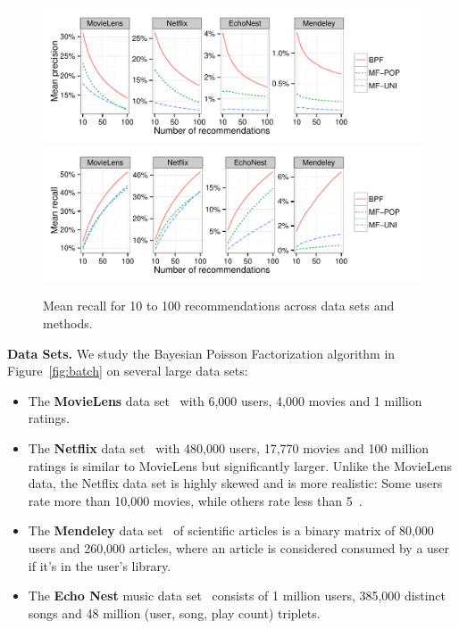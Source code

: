 \begin{figure}[th]
\centering
\includegraphics[width=\textwidth]{./figures/mean_precision_by_method.pdf}\\
\includegraphics[width=\textwidth]{./figures/mean_recall_by_method.pdf}\\
\caption{Mean recall for 10 to 100 recommendations across data sets and methods.}
\label{fig:recall_by_M}
\end{figure}

{\bf Data Sets.} We study the Bayesian Poisson Factorization algorithm
in Figure~\ref{fig:batch} on several large data sets:
\begin{itemize}
\item The {\bf MovieLens} data set~\cite{Herlocker:1999} with 6,000 users, 4,000
  movies and 1 million ratings.
\item The {\bf Netflix} data set~\cite{Koren:2009} with 480,000 users,
  17,770 movies and 100 million ratings is similar to MovieLens but
  significantly larger. Unlike the MovieLens data, the Netflix data
  set is highly skewed and is more realistic: Some users rate more
  than 10,000 movies, while others rate less than
  5~\cite{Salakhutdinov:2008a}.
\item The {\bf Mendeley} data set~\cite{Jack:2010} of scientific
  articles is a binary matrix of
  80,000 users and 260,000 articles, where an article is considered
  consumed by a user if it's in the user's library.
\item The {\bf Echo Nest} music data set~\cite{Bertin-Mahieux:2011} consists of 1
  million users, 385,000 distinct songs and 48 million (user, song,
  play count) triplets.
\end{itemize}

